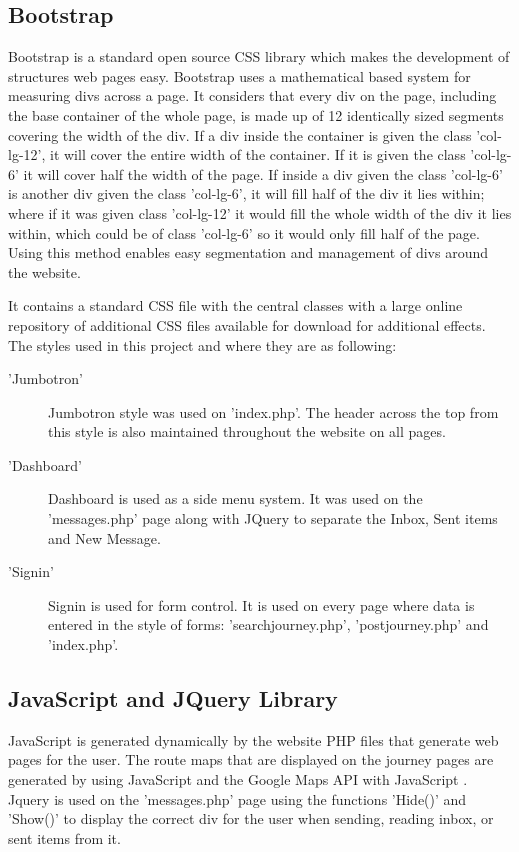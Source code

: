 	\subsection{Bootstrap}
		Bootstrap\cite{bootstrap_library} is a standard open source CSS library which makes the development of structures web pages easy. Bootstrap uses a mathematical based system for measuring divs across a page. It considers that every div on the page, including the base container of the whole page, is made up of 12 identically sized segments covering the width of the div. If a div inside the container is given the class 'col-lg-12', it will cover the entire width of the container. If it is given the class 'col-lg-6' it will cover half the width of the page. If inside a div given the class 'col-lg-6' is another div given the class 'col-lg-6', it will fill half of the div it lies within; where if it was given class 'col-lg-12' it would fill the whole width of the div it lies within, which could be of class 'col-lg-6' so it would only fill half of the page. Using this method enables easy segmentation and management of divs around the website.
		
		It contains a standard CSS file with the central classes with a large online repository of additional CSS files available for download for additional effects. The styles used in this project and where they are as following:
		\begin{description}
		\item['Jumbotron'] Jumbotron\cite{bootstrap_jumbotron} style was used on 'index.php'. The header across the top from this style is also maintained throughout the website on all pages.
		\item['Dashboard'] Dashboard\cite{bootstrap_dashboard} is used as a side menu system. It was used on the 'messages.php' page along with JQuery to separate the Inbox, Sent items and New Message.
		\item['Signin'] Signin\cite{bootstrap_signin} is used for form control. It is used on every page where data is entered in the style of forms: 'search\textunderscore journey.php', 'post\textunderscore journey.php' and 'index.php'.
		\end{description}
	\subsection{JavaScript and JQuery Library}
		JavaScript is generated dynamically by the website PHP files that generate web pages for the user. The route maps that are displayed on the journey pages are generated by using JavaScript and the Google Maps API with JavaScript \cite{google_maps_javascript_api}. Jquery is used on the 'messages.php' page using the functions 'Hide()' and 'Show()' to display the correct div for the user when sending, reading inbox, or sent items from it.

